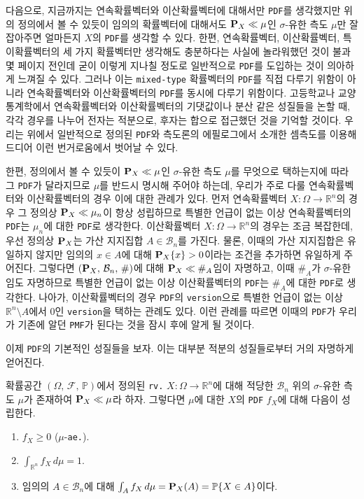 다음으로, 지금까지는 연속확률벡터와 이산확률벡터에 대해서만 \texttt{PDF}를 생각했지만 위의 정의에서 볼 수 있듯이 임의의 확률벡터에 대해서도 $\mathbf{P}_X\ll\mu$인 $\sigma$-유한 측도 $\mu$만 잘 잡아주면 얼마든지 $X$의 \texttt{PDF}를 생각할 수 있다. 한편, 연속확률벡터, 이산확률벡터, 특이확률벡터의 세 가지 확률벡터만 생각해도 충분하다는 사실에 놀라워했던 것이 불과 몇 페이지 전인데 굳이 이렇게 지나칠 정도로 일반적으로 \texttt{PDF}를 도입하는 것이 의아하게 느껴질 수 있다. 그러나 이는 \texttt{mixed-type} 확률벡터의 \texttt{PDF}를 직접 다루기 위함이 아니라 연속확률벡터와 이산확률벡터의 \texttt{PDF}를 동시에 다루기 위함이다. 고등학교나 교양 통계학에서 연속확률벡터와 이산확률벡터의 기댓값이나 분산 같은 성질들을 논할 때, 각각 경우를 나누어 전자는 적분으로, 후자는 합으로 접근했던 것을 기억할 것이다. 우리는 위에서 일반적으로 정의된 \texttt{PDF}와 측도론의 에필로그에서 소개한 셈측도를 이용해 드디어 이런 번거로움에서 벗어날 수 있다.

한편, 정의에서 볼 수 있듯이 $\mathbf{P}_X\ll\mu$인 $\sigma$-유한 측도 $\mu$를 무엇으로 택하는지에 따라 그 \texttt{PDF}가 달라지므로 $\mu$를 반드시 명시해 주어야 하는데, 우리가 주로 다룰 연속확률벡터와 이산확률벡터의 경우 이에 대한 관례가 있다. 먼저 연속확률벡터 $X:\Omega\to\mathbb{R}^n$의 경우 그 정의상 $\mathbf{P}_X\ll\mu_n$이 항상 성립하므로 특별한 언급이 없는 이상 연속확률벡터의 \texttt{PDF}는 $\mu_n$에 대한 \texttt{PDF}로 생각한다. 이산확률벡터 $X:\Omega\to\mathbb{R}^n$의 경우는 조금 복잡한데, 우선 정의상 $\mathbf{P}_X$는 가산 지지집합 $A\in\mathcal{B}_n$를 가진다. 물론, 이때의 가산 지지집합은 유일하지 않지만 임의의 $x\in A$에 대해 $\mathbf{P}_X\{x\}>0$이라는 조건을 추가하면 유일하게 주어진다. 그렇다면 $(\mathbf{P}_X,\,\mathcal{B}_n,\,\#)$에 대해 $\mathbf{P}_X\ll\#_A$임이 자명하고, 이때 $\#_A$가 $\sigma$-유한임도 자명하므로 특별한 언급이 없는 이상 이산확률벡터의 \texttt{PDF}는 $\#_A$에 대한 \texttt{PDF}로 생각한다. 나아가, 이산확률벡터의 경우 \texttt{PDF}의 \texttt{version}으로 특별한 언급이 없는 이상 $\mathbb{R}^n\setminus A$에서 $0$인 \texttt{version}을 택하는 관례도 있다. 이런 관례를 따르면 이때의 \texttt{PDF}가 우리가 기존에 알던 \texttt{PMF}가 된다는 것을 잠시 후에 알게 될 것이다.

이제 \texttt{PDF}의 기본적인 성질들을 보자. 이는 대부분 적분의 성질들로부터 거의 자명하게 얻어진다.

\begin{theorem}\label{thm:PDFProp}
    확률공간 $(\Omega,\,\mathcal{F},\,\mathbb{P})$에서 정의된 \texttt{rv.} $X:\Omega\to\mathbb{R}^n$에 대해 적당한 $\mathcal{B}_n$ 위의 $\sigma$-유한 측도 $\mu$가 존재하여 $\mathbf{P}_X\ll\mu$라 하자. 그렇다면 $\mu$에 대한 $X$의 \texttt{PDF} $f_X$에 대해 다음이 성립한다.
    \begin{enumerate}
        \item $f_X\geq0$ ($\mu$-\texttt{ae.}).
        \item $\int_{\mathbb{R}^n}f_X\,d\mu=1$.
        \item 임의의 $A\in\mathcal{B}_n$에 대해 $\int_Af_X\,d\mu=\mathbf{P}_X(A)=\mathbb{P}\{X\in A\}$이다.
    \end{enumerate}
\end{theorem}

